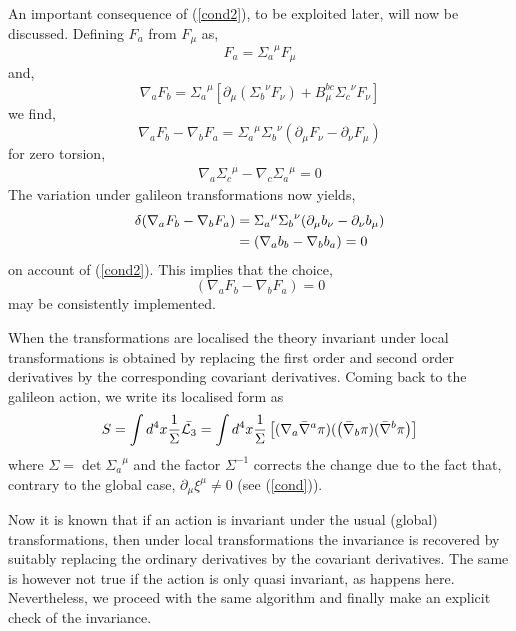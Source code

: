\documentclass[12pt]{article}
\begin{document}
An important consequence of (\ref{cond2}), to be exploited later, will now be discussed. Defining $F_a$ from $F_{\mu}$ as,
\begin{equation}
F_a={\Sigma_a}^{\mu}F_{\mu}
\end{equation}
and,
\begin{equation}
\nabla_a F_b={\Sigma_a}^{\mu}[\partial_{\mu}({\Sigma_b}^{\nu}F_{\nu})+B_{\mu}^{bc}{\Sigma_c}^{\nu}F_{\nu}]
\end{equation} 
we find,
\begin{equation}
\nabla_a F_b-\nabla_b F_a={\Sigma_a}^{\mu}{\Sigma_b}^{\nu}(\partial_{\mu}F_{\nu}-\partial_{\nu}F_{\mu})\label{f}
\end{equation}
for zero torsion, 
\begin{eqnarray}
\nabla_a{\Sigma_c}^\mu - \nabla_c{\Sigma_a}^\mu = 0\label{torsion}
\end{eqnarray}
The variation under galileon transformations now yields,
\begin{align}
\delta(\nabla_a F_b-\nabla_b F_a)&={\Sigma_a}^{\mu}{\Sigma_b}^{\nu}(\partial_{\mu}b_{\nu}-\partial_{\nu}b_{\mu})
\notag\\&=(\nabla_a b_b-\nabla_b b_a)=0
\end{align}
on account of (\ref{cond2}). This implies that the choice, 
\begin{equation}
(\nabla_a F_b-\nabla_b F_a)=0 \label{x}
\end{equation}
may be consistently implemented. 

When the transformations are localised the theory invariant under local transformations is obtained by replacing the first order and second order derivatives by the corresponding covariant derivatives. Coming back to the galileon action, we write its localised form as
\begin{equation}
S =\int d^4x \frac{1}{\Sigma}\bar{{\cal{L}}_3}=\int d^4x \frac{1}{\Sigma}\left[ (\nabla_a{\bar{\nabla}}^a\pi)(\left({\bar{\nabla}}_b\pi) ({\bar{\nabla}}^b\pi\right)\right]
\label{la}
\end{equation}
where $\Sigma = \det{\Sigma_a}^\mu $ and the factor $\Sigma^{-1}$ corrects the change due to the fact that, contrary to the global case, $\partial_\mu \xi^\mu \ne 0$ (see (\ref{cond})). 

Now it is known that if an action is invariant under the usual (global) transformations, then under local transformations the invariance is recovered by suitably replacing the ordinary derivatives by the covariant derivatives. The same is however not true if the action is only quasi invariant, as happens here. Nevertheless, we proceed with the same algorithm and finally make an explicit check of the invariance.
\end{document}
